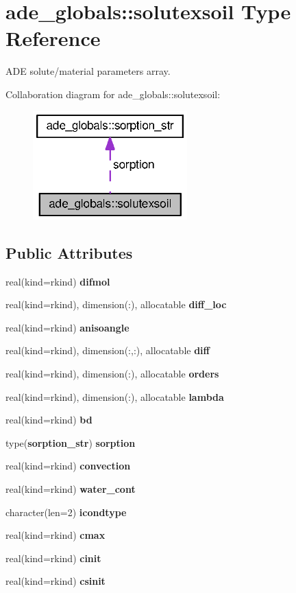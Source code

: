 \section{ade\+\_\+globals\+:\+:solutexsoil Type Reference}
\label{structade__globals_1_1solutexsoil}


A\+DE solute/material parameters array.  




Collaboration diagram for ade\+\_\+globals\+:\+:solutexsoil\+:\nopagebreak
\begin{figure}[H]
\begin{center}
\leavevmode
\includegraphics[width=169pt]{structade__globals_1_1solutexsoil__coll__graph}
\end{center}
\end{figure}
\subsection*{Public Attributes}
\begin{DoxyCompactItemize}
\item 
real(kind=rkind) {\bf difmol}
\item 
real(kind=rkind), dimension(\+:), allocatable {\bf diff\+\_\+loc}
\item 
real(kind=rkind) {\bf anisoangle}
\item 
real(kind=rkind), dimension(\+:,\+:), allocatable {\bf diff}
\item 
real(kind=rkind), dimension(\+:), allocatable {\bf orders}
\item 
real(kind=rkind), dimension(\+:), allocatable {\bf lambda}
\item 
real(kind=rkind) {\bf bd}
\item 
type({\bf sorption\+\_\+str}) {\bf sorption}
\item 
real(kind=rkind) {\bf convection}
\item 
real(kind=rkind) {\bf water\+\_\+cont}
\item 
character(len=2) {\bf icondtype}
\item 
real(kind=rkind) {\bf cmax}
\item 
real(kind=rkind) {\bf cinit}
\item 
real(kind=rkind) {\bf csinit}
\end{DoxyCompactItemize}


